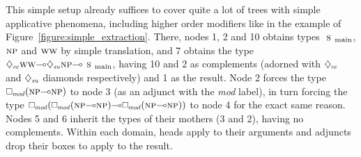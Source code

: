 This simple setup already suffices to cover quite a lot of trees with simple applicative phenomena, including higher order modifiers like in the example of Figure~\ref{figure:simple_extraction}.
There, nodes 1, 2 and 10 obtains types $\smain[s]$, $\np[s]$ and $\ww[s]$ by simple translation, and 7 obtains the type $\ddia{vc}\ww[s]\li\ddia{su}\np[s]\li\smain[s]$, having 10 and 2 as complements (adorned with $\ddia{vc}$ and $\ddia{su}$ diamonds respectively) and 1 as the result.
Node 2 forces the type $\dbox{mod}(\np[s]\li\np[s])$ to node 3 (as an adjunct with the \textit{mod} label), in turn forcing the type $\dbox{mod}(\dbox{mod}(\np[s]\li\np[s])\li\dbox{mod}(\np[s]\li\np[s]))$ to node 4 for the exact same reason. 
Nodes 5 and 6 inherit the types of their mothers (3 and 2), having no complements.
Within each domain, heads apply to their arguments and adjuncts drop their boxes to apply to the result.

